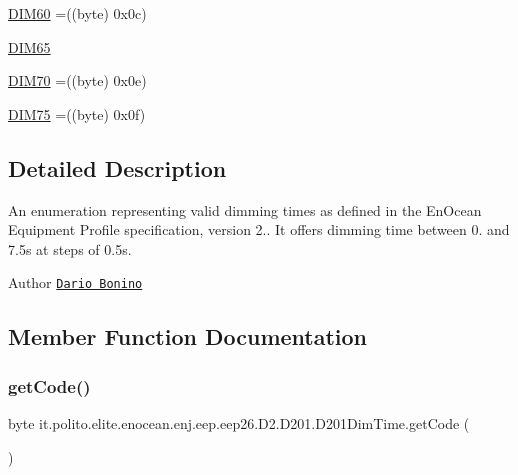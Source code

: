 \begin{DoxyCompactItemize}
\hyperlink{enumit_1_1polito_1_1elite_1_1enocean_1_1enj_1_1eep_1_1eep26_1_1_d2_1_1_d201_1_1_d201_dim_time_a31eb1857fa6f764cd9c3e2b7d8e60eca}{D\+I\+M60} =((byte) 0x0c)
\item 
\hyperlink{enumit_1_1polito_1_1elite_1_1enocean_1_1enj_1_1eep_1_1eep26_1_1_d2_1_1_d201_1_1_d201_dim_time_a767bbffc5e23ed4e39a525b4b1ebbc7d}{D\+I\+M65}
\item 
\hyperlink{enumit_1_1polito_1_1elite_1_1enocean_1_1enj_1_1eep_1_1eep26_1_1_d2_1_1_d201_1_1_d201_dim_time_a08f27dfbeaa9d5af72968988eafbd9b4}{D\+I\+M70} =((byte) 0x0e)
\item 
\hyperlink{enumit_1_1polito_1_1elite_1_1enocean_1_1enj_1_1eep_1_1eep26_1_1_d2_1_1_d201_1_1_d201_dim_time_a437fce14d59666790fb48ca38e795e2b}{D\+I\+M75} =((byte) 0x0f)
\end{DoxyCompactItemize}


\subsection{Detailed Description}
An enumeration representing valid dimming times as defined in the En\+Ocean Equipment Profile specification, version 2.. It offers dimming time between 0. and 7.\+5s at steps of 0.\+5s.

\begin{DoxyAuthor}{Author}
\href{mailto:dario.bonino@gmail.com}{\tt Dario Bonino} 
\end{DoxyAuthor}


\subsection{Member Function Documentation}
\hypertarget{enumit_1_1polito_1_1elite_1_1enocean_1_1enj_1_1eep_1_1eep26_1_1_d2_1_1_d201_1_1_d201_dim_time_a58e2f1ac00b195baea9d620297035de9}{}\label{enumit_1_1polito_1_1elite_1_1enocean_1_1enj_1_1eep_1_1eep26_1_1_d2_1_1_d201_1_1_d201_dim_time_a58e2f1ac00b195baea9d620297035de9} 
\subsubsection{\texorpdfstring{get\+Code()}{getCode()}}
{\footnotesize\ttfamily byte it.\+polito.\+elite.\+enocean.\+enj.\+eep.\+eep26.\+D2.\+D201.\+D201\+Dim\+Time.\+get\+Code (\begin{DoxyParamCaption}{ }\end{DoxyParamCaption})}

